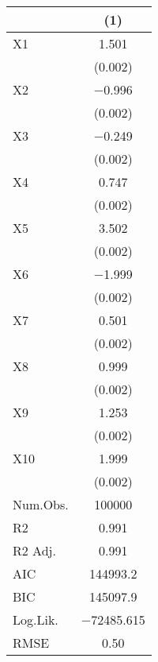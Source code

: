 \documentclass{article}
\begin{document}
\begin{table}
\centering
\begin{tabular}[t]{lc}
\toprule
  & (1)\\
\midrule
X1 & \num{1.501}\\
 & \vphantom{9} (\num{0.002})\\
X2 & \num{-0.996}\\
 & \vphantom{8} (\num{0.002})\\
X3 & \num{-0.249}\\
 & \vphantom{7} (\num{0.002})\\
X4 & \num{0.747}\\
 & \vphantom{6} (\num{0.002})\\
X5 & \num{3.502}\\
 & \vphantom{5} (\num{0.002})\\
X6 & \num{-1.999}\\
 & \vphantom{4} (\num{0.002})\\
X7 & \num{0.501}\\
 & \vphantom{3} (\num{0.002})\\
X8 & \num{0.999}\\
 & \vphantom{2} (\num{0.002})\\
X9 & \num{1.253}\\
 & \vphantom{1} (\num{0.002})\\
X10 & \num{1.999}\\
 & (\num{0.002})\\
\midrule
Num.Obs. & \num{100000}\\
R2 & \num{0.991}\\
R2 Adj. & \num{0.991}\\
AIC & \num{144993.2}\\
BIC & \num{145097.9}\\
Log.Lik. & \num{-72485.615}\\
RMSE & \num{0.50}\\
\bottomrule
\end{tabular}
\end{table}
\end{document}
